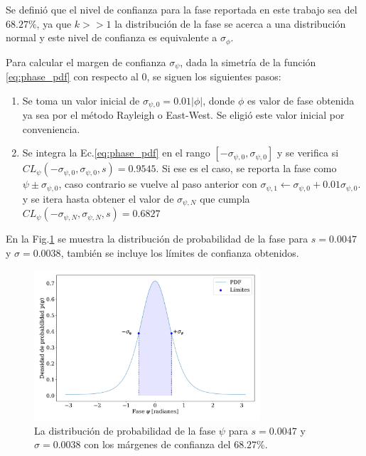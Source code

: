 
Se definió que el nivel de confianza para la fase reportada en este trabajo sea del $68.27\%$, ya que $k>>1$ la distribución de la fase se acerca a una distribución normal y este nivel de confianza es equivalente a $\sigma_\phi$. 

Para calcular el margen de confianza $\sigma_\psi$,  dada la simetría de la función \ref{eq:phase_pdf}  con respecto al 0, se siguen los siguientes  pasos:

\begin{enumerate}
    \item Se toma un valor inicial de $\sigma_{\psi,0}=0.01|\phi|$, donde  $\phi$ es valor de fase obtenida ya sea por el método Rayleigh o East-West. Se eligió este valor inicial por conveniencia.
    \item Se integra la Ec.\ref{eq:phase_pdf} en el rango $[-\sigma_{\psi,0}, \sigma_{\psi,0}]$ y se verifica si $CL_{\psi}(-\sigma_{\psi,0}, \sigma_{\psi,0},s) = 0.9545$.  Si ese es el caso, se reporta la fase como $\psi \pm \sigma_{\psi,0}$, caso contrario se vuelve al paso anterior con $\sigma_{\psi,1} \leftarrow \sigma_{\psi,0} + 0.01\sigma_{\psi,0}$. \label{paso2} y se itera hasta obtener el valor de $\sigma_{\psi,N}$ que cumpla $CL_{\psi}(-\sigma_{\psi,N}, \sigma_{\psi,N},s) = 0.6827$
\end{enumerate}

En la Fig.\ref{fig:phase_prob_ej} se muestra la distribución de probabilidad de la fase para $s=0.0047$ y $\sigma = 0.0038$, también se incluye los límites de confianza obtenidos.

\begin{figure}[H]
    \begin{small}
        \begin{center}
            \includegraphics[width=0.75\textwidth]{phase_prob_ej_v2.pdf}
        \end{center}
        \caption{La distribución de probabilidad de la fase $\psi$ para $s=0.0047$ y $\sigma = 0.0038$ con los márgenes de confianza del $68.27\%$.}
        \label{fig:phase_prob_ej}
    \end{small}
\end{figure}